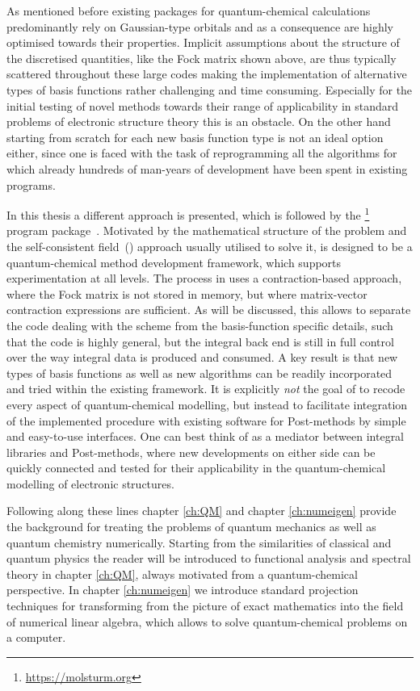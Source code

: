 As mentioned before existing packages for quantum-chemical calculations
predominantly rely on Gaussian-type orbitals
and as a consequence are highly optimised towards their properties.
Implicit assumptions
about the structure of the discretised quantities,
like the Fock matrix shown above,
are thus typically scattered throughout these large codes
making the implementation of alternative types of basis functions
rather challenging and time consuming.
Especially for the initial testing of novel methods
towards their range of applicability
in standard problems of electronic structure theory
this is an obstacle.
On the other hand starting from scratch for each new basis function type
is not an ideal option either,
since one is faced with the task of reprogramming all the algorithms for which
already hundreds of man-years of development have been spent in existing programs.

In this thesis a different approach is presented,
which is followed by the \molsturm%
\footnote{\url{https://molsturm.org}}
program package~\cite{molsturmWeb}.
Motivated by the mathematical structure of the \HF problem
and the self-consistent field~(\SCF) approach usually utilised
to solve it, \molsturm is designed
to be a quantum-chemical method development framework,
which supports experimentation at all levels.
The \SCF process in \molsturm uses a contraction-based approach,
where the Fock matrix is not stored in memory,
but where matrix-vector contraction expressions are sufficient.
As will be discussed, this allows to separate the code dealing with the \SCF scheme
from the basis-function specific details,
such that the \SCF code is highly general,
but the integral back end is still in full control
over the way integral data is produced and consumed.
A key result is that new types of basis functions
as well as new \SCF algorithms can be readily incorporated
and tried within the existing framework.
It is explicitly \emph{not} the goal of \molsturm to recode
every aspect of quantum-chemical modelling,
but instead to facilitate integration
of the implemented \SCF procedure
with existing software for Post-\HF methods
by simple and easy-to-use interfaces.
One can best think of \molsturm as a mediator
between integral libraries and Post-\HF methods,
where new developments on either side
can be quickly connected and tested for their applicability
in the quantum-chemical modelling of electronic structures.

Following along these lines chapter
\ref{ch:QM} and chapter \ref{ch:numeigen}
provide the background for treating the problems of quantum mechanics
as well as quantum chemistry numerically.
Starting from the similarities of classical and quantum physics
the reader will be introduced to functional analysis
and spectral theory in chapter \ref{ch:QM},
always motivated from a quantum-chemical perspective.
In chapter \ref{ch:numeigen} we introduce standard projection techniques
for transforming from the picture of exact mathematics
into the field of numerical linear algebra,
which allows to solve quantum-chemical problems on a computer.

